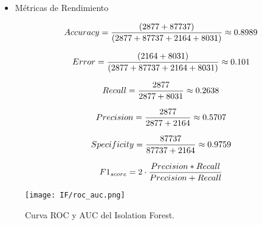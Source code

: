 \begin{itemize}
      \item Métricas de Rendimiento

            \begin{align}
                  Accuracy = \frac{(2877+87737)}{(2877+87737+2164+8031)}\approx 0.8989 \notag \\
                  \label{eq:accuracy_if}
            \end{align}


            \begin{align}
                  Error = \frac{(2164+8031)}{(2877+87737+2164+8031)}\approx 0.101 \notag \\
                  \label{eq:error_if}
            \end{align}

            \begin{align}
                  Recall = \frac{2877}{2877+8031}\approx 0.2638 \notag \\
                  \label{eq:recall_if}
            \end{align}

            \begin{align}
                  Precision = \frac{2877}{2877+2164}\approx 0.5707 \notag \\
                  \label{eq:precision_if}
            \end{align}

            \begin{align}
                  Specificity = \frac{87737}{87737+2164}\approx 0.9759 \notag \\
                  \label{eq:specificity_if}
            \end{align}

            \begin{align}
                  F1_{score} = 2 \cdot \frac{Precision * Recall}{Precision+Recall} \notag \\
                  \label{eq:f1_if}
            \end{align}

\end{itemize}

\begin{figure}[ht!]
      \centering
      \texttt{[image: IF/roc\_auc.png]}
      \caption{Curva ROC y AUC del Isolation Forest.}
      \label{fig:roc_if}
\end{figure}

